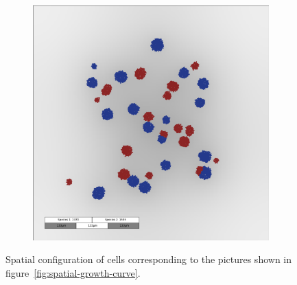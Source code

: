 \documentclass[10pt,A4paper]{article}
\numberwithin{equation}{section}
\begin{document}
\begin{figure}
\begin{subfigure}[c]{0.5\textwidth}
    \end{subfigure}%
    \begin{subfigure}[c]{0.5\textwidth}
        \includegraphics[width=\textwidth]{Figures/abm-random/snapshot_00012000.png}%
    \end{subfigure}
    \caption{
        Spatial configuration of cells corresponding to the pictures shown in figure~\ref{fig:spatial-growth-curve}.
    }
    \label{fig:supplement-spatial-initial-config-cells}
\end{figure}
%
%
\end{document}
